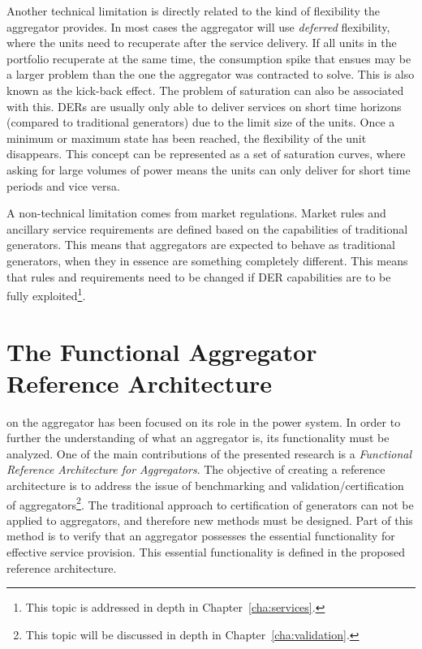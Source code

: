 Another technical limitation is directly related to the kind of flexibility the aggregator provides. In most cases the aggregator will use \emph{deferred} flexibility, where the units need to recuperate after the service delivery. If all units in the portfolio recuperate at the same time, the consumption spike that ensues may be a larger problem than the one the aggregator was contracted to solve. This is also known as the kick-back effect. The problem of saturation can also be associated with this. DERs are usually only able to deliver services on short time horizons (compared to traditional generators) due to the limit size of the units. Once a minimum or maximum state has been reached, the flexibility of the unit disappears. This concept can be represented as a set of saturation curves, where asking for large volumes of power means the units can only deliver for short time periods and vice versa.

A non-technical limitation comes from market regulations. Market rules and ancillary service requirements are defined based on the capabilities of traditional generators. This means that aggregators are expected to behave as traditional generators, when they in essence are something completely different. This means that rules and requirements need to be changed if DER capabilities are to be fully exploited\footnote{This topic is addressed in depth in Chapter~\ref{cha:services}.}.

\section{The Functional Aggregator Reference Architecture}\label{sec:MAINaggrefarch}
 on the aggregator has been focused on its role in the power system. In order to further the understanding of what an aggregator is, its functionality must be analyzed. One of the main contributions of the presented research is a \emph{Functional Reference Architecture for Aggregators}. The objective of creating a reference architecture is to address the issue of benchmarking and validation/certification of aggregators\footnote{This topic will be discussed in depth in Chapter~\ref{cha:validation}.}. The traditional approach to certification of generators can not be applied to aggregators, and therefore new methods must be designed. Part of this method is to verify that an aggregator possesses the essential functionality for effective service provision. This essential functionality is defined in the proposed reference architecture.

